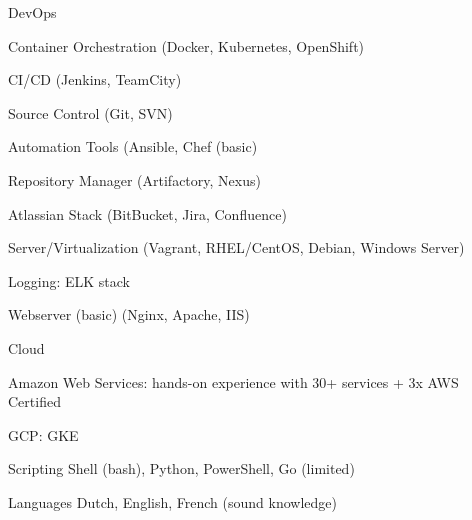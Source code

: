 

\begin{cvskills}

  \cvskill
    {DevOps} %
    {
      \begin{cvitems} %
        \item {Container Orchestration (Docker, Kubernetes, OpenShift)}
        \item {CI/CD (Jenkins, TeamCity)}
        \item {Source Control (Git, SVN)}
        \item {Automation Tools (Ansible, Chef (basic)}
        \item {Repository Manager (Artifactory, Nexus)}
        \item {Atlassian Stack (BitBucket, Jira, Confluence)}
        \item {Server/Virtualization (Vagrant, RHEL/CentOS, Debian, Windows Server)}
        \item {Logging: ELK stack}
        \item {Webserver (basic) (Nginx, Apache, IIS)}
      \end{cvitems}
    }


  \cvskill
    {Cloud} %
    {
      \begin{cvitems} %
        \item {Amazon Web Services: hands-on experience with 30+ services + 3x AWS Certified}
        \item {GCP: GKE}
      \end{cvitems}
    }

  \cvskill
    {Scripting} %
    {Shell (bash), Python, PowerShell, Go (limited)} %

  \cvskill
    {Languages} %
    {Dutch, English, French (sound knowledge)} %

\end{cvskills}
